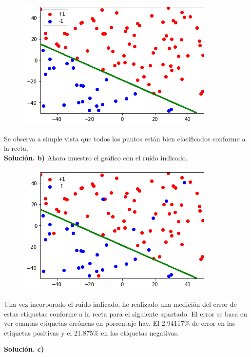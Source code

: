 \documentclass[a4paper,11pt]{article}
\begin{document}
\begin{figure}[h]
\includegraphics[scale=0.7]{ej2a}
\centering
\end{figure}

Se observa a simple vista que todos los puntos están bien clasificados conforme a la recta.\\

\textbf{Solución. b)} Ahora muestro el gráfico con el ruido indicado. 

\begin{figure}[h]
\includegraphics[scale=0.7]{ej2b}
\centering
\end{figure}

Una vez incorporado el ruido indicado, he realizado una medición del error de estas etiquetas conforme a la recta para el siguiente apartado. El error se basa en ver cuantas etiquetas erróneas en porcentaje hay. El 2.94117$\%$ de error en las etiquetas positivas y el 21.875$\%$  en las etiquetas negativas.

\newpage

\textbf{Solución. c)}
\end{document}
